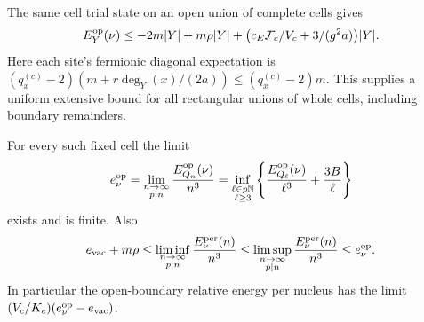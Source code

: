 The same cell trial state on an open union of complete cells gives
\begin{equation}
 E_Y^{\rm op}(\nu)\le -2m|Y|+m\rho|Y|
     +\bigl(c_E\mathcal F_c/V_c+3/(g^2a)\bigr)|Y|.
 \label{therm4-open-source-upper}
\end{equation}
Here each site's fermionic diagonal expectation is
$(q_x^{(c)}-2)(m+r\deg_Y(x)/(2a))\le(q_x^{(c)}-2)m$.
This supplies a uniform extensive bound for all rectangular unions
of whole cells, including boundary remainders.

\begin{theorem}
\label{therm4-open-source-limit}
For every such fixed cell the limit
\begin{equation}
 e_\nu^{\rm op}=\lim_{\substack{n\to\infty\\p\mid n}}
                   \frac{E_{Q_n}^{\rm op}(\nu)}{n^3}
 =\inf_{\substack{\ell\in p\mathbb N\\\ell\ge3}}
       \left\{\frac{E_{Q_\ell}^{\rm op}(\nu)}{\ell^3}
                    +\frac{3B}{\ell}\right\}
 \label{therm4-open-source-limit-eq}
\end{equation}
exists and is finite.  Also
\begin{equation}
 e_{\rm vac}+m\rho
 \le\liminf_{\substack{n\to\infty\\p\mid n}}
                     \frac{E_\nu^{\rm per}(n)}{n^3}
 \le\limsup_{\substack{n\to\infty\\p\mid n}}
                     \frac{E_\nu^{\rm per}(n)}{n^3}
 \le e_\nu^{\rm op}.
 \label{therm4-periodic-bracket}
\end{equation}
In particular the open-boundary relative energy per nucleus has the
limit $(V_c/K_c)(e_\nu^{\rm op}-e_{\rm vac})$.
\end{theorem}
